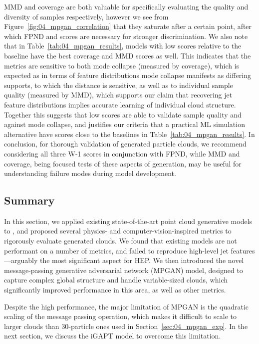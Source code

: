 MMD and coverage are both valuable for specifically evaluating the quality and diversity of samples respectively, however we see from Figure~\ref{fig:04_mpgan_correlation} that they saturate after a certain point, after which FPND and \wass scores are necessary for stronger discrimination.
We also note that in Table~\ref{tab:04_mpgan_results}, models with low \wass scores relative to the baseline have the best coverage and MMD scores as well.
This indicates that the \wass metrics are sensitive to both mode collapse (measured by coverage), which is expected as in terms of feature distributions mode collapse manifests as differing supports, to which the \wass distance is sensitive, as well as to individual sample quality (measured by MMD), which supports our claim that recovering jet feature distributions implies accurate learning of individual cloud structure.
Together this suggests that low \wass scores are able to validate sample quality and against mode collapse, and justifies our criteria that a practical ML simulation alternative have \wass scores close to the baselines in Table~\ref{tab:04_mpgan_results}.
In conclusion, for thorough validation of generated particle clouds, we recommend considering all three W-1 scores in conjunction with FPND, while MMD and coverage, being focused tests of these aspects of generation, may be useful for understanding failure modes during model development.


\subsection{Summary}
\label{sec:04_mpgan_summary}

In this section, we applied existing state-of-the-art point cloud generative models to \jetnet, and proposed several physics- and computer-vision-inspired metrics to rigorously evaluate generated clouds.
We found that existing models are not performant on a number of metrics, and failed to reproduce high-level jet features---arguably the most significant aspect for HEP.
We then introduced the novel message-passing generative adversarial network (MPGAN) model, designed to capture complex global structure and handle variable-sized clouds, which significantly improved performance in this area, as well as other metrics.

Despite the high performance, the major limitation of MPGAN is the quadratic scaling of the message passing operation, which makes it difficult to scale to larger clouds than 30-particle ones used in Section~\ref{sec:04_mpgan_exp}.
In the next section, we discuss the iGAPT model to overcome this limitation.


